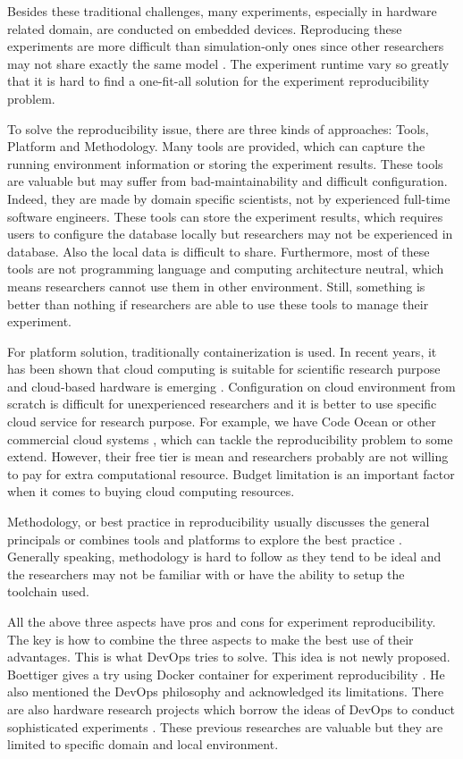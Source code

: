 \documentclass[10pt, conference, compsocconf]{IEEEtran}
\begin{document}
Besides these traditional challenges, many experiments, especially in hardware related domain, are conducted on
embedded devices. Reproducing these experiments are more difficult than simulation-only ones since other researchers may not share exactly the same model \cite{report2017}. The experiment runtime vary so greatly that it is hard to find a
one-fit-all solution for the experiment reproducibility problem.

To solve the reproducibility issue, there are three kinds of approaches: Tools, Platform and Methodology. Many tools \cite{greff2017sacred} are provided, which can capture the running environment information or storing the experiment results. These tools are valuable but may suffer from bad-maintainability and difficult configuration. Indeed, they are made by domain specific scientists, not by experienced full-time software engineers. These tools can store the experiment results, which requires users to configure the database locally but researchers may not be experienced in database. Also the local data is difficult to share. Furthermore, most of these tools are not programming language and computing architecture neutral, which means researchers cannot use them in other environment. Still, something is better than nothing if researchers are able to use these tools to manage their experiment.

For platform solution, traditionally containerization is used. In recent years, it has been shown that cloud computing is suitable for scientific research purpose \cite{Howe12} and cloud-based hardware is emerging \cite{cloudhard}. Configuration on cloud environment from scratch is difficult for unexperienced researchers and it is better to use specific cloud service for research purpose. For example, we have Code Ocean or other commercial cloud systems \cite{perkel2018data}, which can tackle the reproducibility problem to some extend. However, their free tier is mean and researchers probably are not willing to pay for extra computational resource. Budget limitation is an important factor when it comes to buying cloud computing resources.

Methodology, or best practice in reproducibility usually discusses the general principals \cite{stodden2014best} or combines tools and platforms to explore the best practice \cite{QashaCW16}. Generally speaking, methodology is hard to follow as they tend to be ideal and the researchers may not be familiar with or have the ability to setup the toolchain used.  

All the above three aspects have pros and cons for experiment reproducibility. The key is how to combine the three aspects to make the best use of their advantages. This is what DevOps tries to solve. This idea is not newly proposed. Boettiger gives a try using Docker container for experiment reproducibility \cite{Boettiger15}.
He also mentioned the DevOps philosophy and acknowledged its limitations.
There are also hardware research projects which borrow the ideas of DevOps to conduct sophisticated experiments \cite{chwalisz2019walker}. These previous researches are valuable but they are limited to specific domain and local environment.
\end{document}
